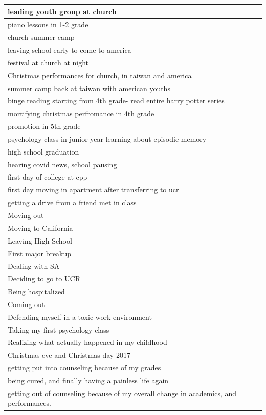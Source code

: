 \documentclass[
  .7em,
  letterpaper,
  DIV=11,
  numbers=noendperiod]{scrartcl}
\begin{document}
\begin{table}
\begin{tabular}{l}
\hline
leading youth group at church\\
\hline
piano lessons in 1-2 grade\\
\hline
church summer camp\\
\hline
leaving school early to come to america\\
\hline
festival at church at night\\
\hline
Christmas performances for church, in taiwan and america\\
\hline
summer camp back at taiwan with american youths\\
\hline
binge reading starting from 4th grade- read entire harry potter series\\
\hline
mortifying christmas perfromance in 4th grade\\
\hline
promotion in 5th grade\\
\hline
psychology class in junior year learning about episodic memory\\
\hline
high school graduation\\
\hline
hearing covid news, school pausing\\
\hline
first day of college at cpp\\
\hline
first day moving in apartment after transferring to ucr\\
\hline
getting a drive from a friend met in class\\
\hline
Moving out\\
\hline
Moving to California\\
\hline
Leaving High School\\
\hline
First major breakup\\
\hline
Dealing with SA\\
\hline
Deciding to go to UCR\\
\hline
Being hospitalized\\
\hline
Coming out\\
\hline
Defending myself in a toxic work environment\\
\hline
Taking my first psychology class\\
\hline
Realizing what actually happened in my childhood\\
\hline
Christmas eve and Christmas day 2017\\
\hline
getting put into counseling because of my grades\\
\hline
being cured, and finally having a painless life again\\
\hline
getting out of counseling because of my overall change in academics, and performances.\\

\end{tabular}
\end{table}
\end{document}
